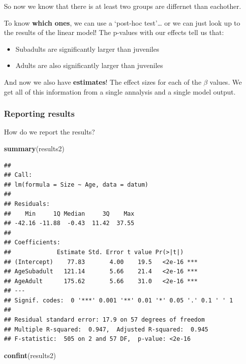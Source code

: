\documentclass[
]{article}
\newenvironment{Shaded}{\begin{snugshade}}{\end{snugshade}}
\newcommand{\FunctionTok}[1]{\textcolor[rgb]{0.13,0.29,0.53}{\textbf{#1}}}
\newcommand{\NormalTok}[1]{#1}
\providecommand{\tightlist}{%
  \setlength{\itemsep}{0pt}\setlength{\parskip}{0pt}}
\begin{document}
So now we know that there is at least two groups are differnet than
eachother.

To know \textbf{which ones}, we can use a `post-hoc test'\ldots{} or we
can just look up to the results of the linear model! The p-values with
our effects tell us that:

\begin{itemize}
\tightlist
\item
  Subadults are significantly larger than juveniles
\item
  Adults are also significantly larger than juveniles
\end{itemize}

And now we also have \textbf{estimates}! The effect sizes for each of
the \(\beta\) values. We get all of this information from a single
annalysis and a single model output.

\subsubsection{Reporting results}\label{reporting-results}

How do we report the results?

\begin{Shaded}
\begin{Highlighting}[]
\FunctionTok{summary}\NormalTok{(results2)}
\end{Highlighting}
\end{Shaded}

\begin{verbatim}
## 
## Call:
## lm(formula = Size ~ Age, data = datum)
## 
## Residuals:
##    Min     1Q Median     3Q    Max 
## -42.16 -11.88  -0.43  11.42  37.55 
## 
## Coefficients:
##             Estimate Std. Error t value Pr(>|t|)    
## (Intercept)    77.83       4.00    19.5   <2e-16 ***
## AgeSubadult   121.14       5.66    21.4   <2e-16 ***
## AgeAdult      175.62       5.66    31.0   <2e-16 ***
## ---
## Signif. codes:  0 '***' 0.001 '**' 0.01 '*' 0.05 '.' 0.1 ' ' 1
## 
## Residual standard error: 17.9 on 57 degrees of freedom
## Multiple R-squared:  0.947,  Adjusted R-squared:  0.945 
## F-statistic:  505 on 2 and 57 DF,  p-value: <2e-16
\end{verbatim}

\begin{Shaded}
\begin{Highlighting}[]
\FunctionTok{confint}\NormalTok{(results2)}
\end{Highlighting}
\end{Shaded}
\end{document}
